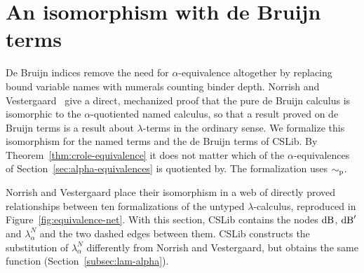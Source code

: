 \section{An isomorphism with de Bruijn terms}
\label{sec:de-bruijn}

De Bruijn indices remove the need for $\alpha$-equivalence altogether by
replacing bound variable names with numerals counting binder depth.
Norrish and Vestergaard~\cite{norrish2007a} give a direct,
mechanized proof that the pure de Bruijn calculus is isomorphic to
the $\alpha$-quotiented named calculus, so that a result proved on de
Bruijn terms is a result about $\lambda$-terms in the ordinary sense. We
formalize this isomorphism for the named terms and the de Bruijn
terms of CSLib.
By Theorem~\ref{thm:crole-equivalence} it does not matter which of
the $\alpha$-equivalences of Section~\ref{sec:alpha-equivalences} is
quotiented by. The formalization uses $\sim_{\mathrm{p}}$.

Norrish and Vestergaard place their isomorphism in a web of directly
proved relationships between ten formalizations of the untyped
$\lambda$-calculus, reproduced in Figure~\ref{fig:equivalence-net}. With this
section, CSLib contains the nodes $\mathrm{dB}$, $\mathrm{dB}'$ and
$\lambda^{N}_{\alpha}$ and the two dashed edges between them. CSLib
constructs the substitution of $\lambda^{N}_{\alpha}$ differently from
Norrish and Vestergaard, but obtains the same function
(Section~\ref{subsec:lam-alpha}).

